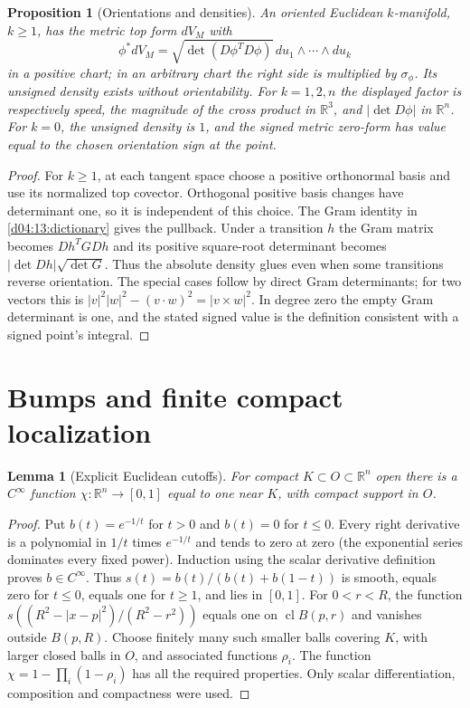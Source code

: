 \documentclass[11pt,oneside,openany]{book}
\newtheorem{lemma}[theorem]{Lemma}
\newtheorem{proposition}[theorem]{Proposition}
\theoremstyle{definition}
\theoremstyle{remark}
\newcommand{\R}{\mathbb R}
\DeclareMathOperator{\cl}{cl}
\newcommand{\family}[1]{}
\begin{document}
\family{K04.14.08}
\begin{proposition}[Orientations and densities]\label{d04:14:metric-density}
An oriented Euclidean $k$-manifold, $k\ge1$, has the metric top form $dV_M$ with
\[
 \phi^*dV_M=\sqrt{\det(D\phi^TD\phi)}\,du_1\wedge\cdots\wedge du_k
\]
in a positive chart; in an arbitrary chart the right side is multiplied
by $\sigma_\phi$. Its unsigned density exists without orientability.
For $k=1,2,n$ the displayed factor is respectively speed, the magnitude of
the cross product in $\R^3$, and $|\det D\phi|$ in $\R^n$.
For $k=0$, the unsigned density is $1$, and the signed metric zero-form
has value equal to the chosen orientation sign at the point.
\end{proposition}
\begin{proof}
For $k\ge1$, at each tangent space choose a positive orthonormal basis and use its
normalized top covector. Orthogonal positive basis changes have determinant
one, so it is independent of this choice. The Gram identity in
\cref{d04:13:dictionary} gives the pullback. Under a transition $h$ the
Gram matrix becomes $Dh^T G Dh$ and its positive square-root determinant
becomes $|\det Dh|\sqrt{\det G}$. Thus the absolute density glues even when
some transitions reverse orientation. The special cases follow by direct
Gram determinants; for two vectors this is
$|v|^2|w|^2-(v\cdot w)^2=|v\times w|^2$.
In degree zero the empty Gram determinant is one, and the stated signed
value is the definition consistent with a signed point's integral.
\end{proof}

\section{Bumps and finite compact localization}
\family{K04.14.07}\family{K04.14.10}
\begin{lemma}[Explicit Euclidean cutoffs]\label{d04:14:bumps}
For compact $K\subset O\subset\R^n$ open there is a $C^\infty$ function
$\chi:\R^n\to[0,1]$ equal to one near $K$, with compact support in $O$.
\end{lemma}
\begin{proof}
Put $b(t)=e^{-1/t}$ for $t>0$ and $b(t)=0$ for $t\le0$.
Every right derivative is a polynomial in $1/t$ times $e^{-1/t}$ and tends
to zero at zero (the exponential series dominates every fixed power).
Induction using the scalar derivative definition proves $b\in C^\infty$.
Thus
$s(t)=b(t)/(b(t)+b(1-t))$ is smooth, equals zero for $t\le0$, equals one
for $t\ge1$, and lies in $[0,1]$.
For $0<r<R$, the function
$s((R^2-|x-p|^2)/(R^2-r^2))$ equals one on $\cl B(p,r)$ and vanishes
outside $B(p,R)$. Choose finitely many such smaller balls covering $K$,
with larger closed balls in $O$, and associated functions $\rho_i$.
The function $\chi=1-\prod_i(1-\rho_i)$ has all the required properties.
Only scalar differentiation, composition and compactness were used.
\end{proof}
\end{document}
